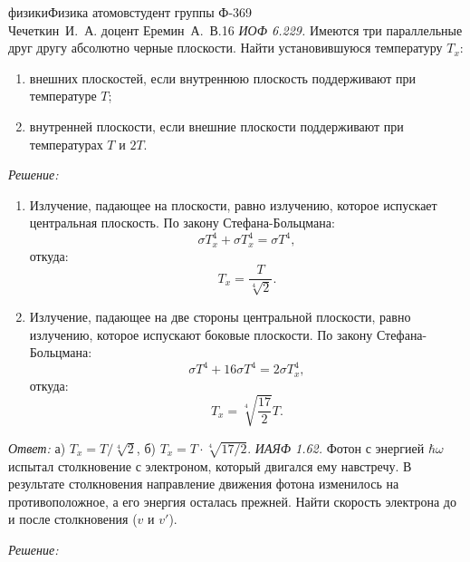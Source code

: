 




\renewcommand{\labelenumi}{\asbuk{enumi})}


{физики}{Физика атомов}{студент группы Ф-369\\Чечеткин~И.~А.}
{доцент Еремин~А.~В.}{\!\!}{16}
\newpage
\emph{ИОФ 6.229.}
Имеются три параллельные друг другу абсолютно черные плоскости.
Найти установившуюся температуру \( T_x \):
\vspace*{-.8em}
\begin{enumerate} \itemsep-.5em
    \item внешних плоскостей, если внутреннюю плоскость поддерживают при
    температуре \( T \);
    \item внутренней плоскости, если внешние плоскости поддерживают при
    температурах \( T \) и \( 2T \).
\end{enumerate}

\vspace*{2em}
\emph{Решение:}
\begin{enumerate}
    \item Излучение, падающее на плоскости, равно излучению, которое испускает
    центральная плоскость. По закону Стефана-Больцмана:
    \[
        \sigma T_x^4 + \sigma T_x^4 = \sigma T^4,
    \]
    откуда:
    \[
        T_x = \frac{T}{\sqrt[4]{2}}.
    \]
    \item Излучение, падающее на две стороны центральной плоскости, равно
    излучению, которое испускают боковые плоскости. По закону Стефана-Больцмана:
    \[
        \sigma T^4 + 16\sigma T^4 = 2\sigma T_x^4,
    \]
    откуда:
    \[
        T_x = \sqrt[4]{\frac{17}{2}}T.
    \]
\end{enumerate}
\vspace*{2em}        
\emph{Ответ:} а) \( T_x = T/\sqrt[4]{2} \), б) \( T_x = T\cdot\sqrt[4]{17/2} \). 
\newpage
\emph{ИАЯФ 1.62.}
Фотон с энергией \( \hbar\omega \) испытал столкновение с электроном, который
двигался ему навстречу. В результате столкновения направление движения фотона
изменилось на противоположное, а его энергия осталась прежней. Найти скорость
электрона до и после столкновения (\( v \) и \( v' \)).

\vspace*{2em}
\emph{Решение:}

